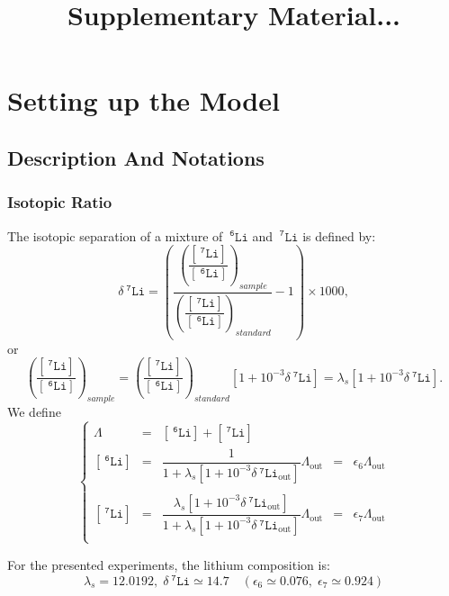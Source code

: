 \documentclass[aps,onecolumn,10pt]{revtex4}
\newcommand{\mychem}[1]{\mathtt{#1}}
\newcommand{\myconc}[1]{\left\lbrack{#1}\right\rbrack}
\newcommand{\spLi}[1]{{~^{\mychem{#1}}\mychem{Li}}}
\newcommand{\Li}[1]{\myconc{\spLi{#1}}}
\newcommand{\deltaLi}{ {\delta\!\!\!\spLi{7}} }
\newcommand{\deltaLiOut}{{\deltaLi}_{\mathrm{out}}}
\newcommand{\LiAll}{\Lambda}
\newcommand{\LiAllOut}{{\LiAll}_{\mathrm{out}}}
\begin{document}
\title{Supplementary Material...}
\maketitle

\section{Setting up the Model}

\subsection{Description And Notations}

\subsubsection{Isotopic Ratio}
The isotopic separation of a mixture of $\spLi{6}$ and $\spLi{7}$ is defined by:
\begin{equation}
	\deltaLi = \left(
		\dfrac{\left(\dfrac{\Li{7}}{\Li{6}}\right)_{sample}}
		{\left(\dfrac{\Li{7}}{\Li{6}}\right)_{standard}}
		 -1 
	\right) \times 1000,
\end{equation}
or
\begin{equation}
	\left(\dfrac{\Li{7}}{\Li{6}}\right)_{sample} = \left(\dfrac{\Li{7}}{\Li{6}}\right)_{standard} \left[1+10^{-3}\deltaLi\right] = \lambda_s \left[1+10^{-3}\deltaLi\right].
\end{equation}
We define
\begin{equation}
\left\lbrace
\begin{array}{rclcl}
	\LiAll & = & \Li{6} + \Li{7}\\
	\Li{6} & = & \dfrac{1}{1+\lambda_s \left[1+10^{-3}\deltaLiOut\right] } \LiAllOut & = & \epsilon_6 \LiAllOut   \\
	\\
	\Li{7} & = & \dfrac{\lambda_s \left[1+10^{-3}\deltaLiOut\right]}{1+\lambda_s \left[1+10^{-3}\deltaLiOut\right] } \LiAllOut & = & \epsilon_7 \LiAllOut\\
\end{array}
\right.
\end{equation}

For the presented experiments, the lithium composition is:
\begin{equation}
	\lambda_s = 12.0192, \; \deltaLi \simeq 14.7 \quad 	(\epsilon_6 \simeq 0.076,\;\epsilon_7 \simeq 0.924)
\end{equation}
\end{document}
